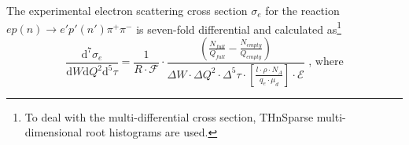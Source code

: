 The experimental electron scattering cross section $\sigma_{e}$ for the reaction $ep(n) \rightarrow e'p'(n') \pi^{+} \pi^{-}$ is seven-fold differential and calculated as\footnote[10]{To deal with the multi-differential cross section, THnSparse multi-dimensional root histograms are used.}
\begin{equation}
\frac{\textrm{d}^{7}\sigma_{e}}{\textrm{d}W\textrm{d}Q^{2}\textrm{d}^{5}\tau} = \frac{1}{ R \! \cdot \! \mathcal{F}}  \cdot 
\frac{\left( \frac{N_{full}}{Q_{full}}-\frac{N_{empty}}{Q_{empty}} \right)}{
\Delta W \! \cdot \! \Delta Q^{2} \! \cdot \! \Delta^{5} \tau \! \cdot \! \left[ \frac{l \cdot \rho \cdot N_{A}}{q_{e}\cdot \mu_{d}} \right]\! \cdot \!\mathcal{E}} \textrm{ , where}
\label{expcrossect}
\end{equation}
